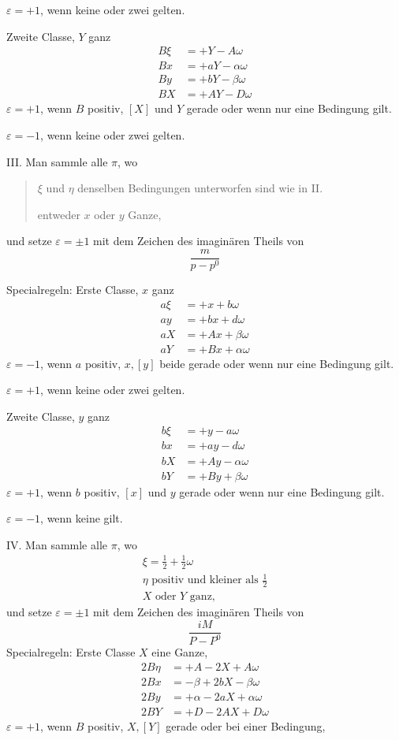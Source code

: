 $\varepsilon=+1$, wenn keine oder zwei gelten.

Zweite Classe, $Y$ ganz
\[
\begin{aligned}
B\xi&=+Y-A\omega\\
Bx&=+aY-\alpha\omega\\
By&=+bY-\beta\omega\\
BX&=+AY-D\omega
\end{aligned}
\]
$\varepsilon=+1$, wenn $B$ positiv, $[X]$ und $Y$ gerade oder wenn nur eine Bedingung gilt.

$\varepsilon=-1$, wenn keine oder zwei gelten.

III. Man sammle alle $\pi$, wo
\begin{quote}
$\xi$ und $\eta$ denselben Bedingungen unterworfen sind wie in II.\par
entweder $x$ oder $y$ Ganze,
\end{quote}
und setze $\varepsilon=\pm1$ mit dem Zeichen des imaginären Theils von
\[
\frac{m}{p-p^0}
\]

Specialregeln: Erste Classe, $x$ ganz
\[
\begin{aligned}
a\xi&=+x+b\omega\\
ay&=+bx+d\omega\\
aX&=+Ax+\beta\omega\\
aY&=+Bx+\alpha\omega
\end{aligned}
\]
$\varepsilon=-1$, wenn $a$ positiv, $x,[y]$ beide gerade oder wenn nur eine Bedingung gilt.

$\varepsilon=+1$, wenn keine oder zwei gelten.

Zweite Classe, $y$ ganz
\[
\begin{aligned}
b\xi&=+y-a\omega\\
bx&=+ay-d\omega\\
bX&=+Ay-\alpha\omega\\
bY&=+By+\beta\omega
\end{aligned}
\]
$\varepsilon=+1$, wenn $b$ positiv, $[x]$ und $y$ gerade oder wenn nur eine Bedingung gilt.

$\varepsilon=-1$, wenn keine gilt.

IV. Man sammle alle $\pi$, wo
\[
\begin{array}{l}
\xi=\frac12+\frac12\omega\\
\eta\text{ positiv und kleiner als }\frac12\\
X\text{ oder }Y\text{ ganz,}
\end{array}
\]
und setze $\varepsilon=\pm1$ mit dem Zeichen des imaginären Theils von
\[
\frac{iM}{P-P^0}
\]
Specialregeln: Erste Classe $X$ eine Ganze,
\[
\begin{aligned}
2B\eta&=+A-2X+A\omega\\
2Bx&=-\beta+2bX-\beta\omega\\
2By&=+\alpha-2aX+\alpha\omega\\
2BY&=+D-2AX+D\omega
\end{aligned}
\]
$\varepsilon=+1$, wenn $B$ positiv, $X,[Y]$ gerade oder bei einer Bedingung,


